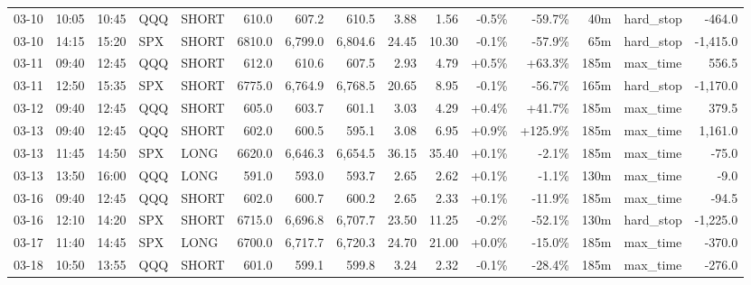 \documentclass[11pt,a4paper,twoside]{article}
\begin{document}
\begin{landscape}
\begin{center}
\begin{longtable}{>{\color{txtmain}}l l l l l r r r r r r r r >{\color{txtmain}}l r}
03-10 & 10:05 & 10:45 & QQQ & SHORT & 610.0 & 607.2 & 610.5 & 3.88 & 1.56 & \textcolor{lossred}{-0.5\%} & \textcolor{lossred}{-59.7\%} & 40m & hard\_stop & \textcolor{lossred}{-464.0} \\
03-10 & 14:15 & 15:20 & SPX & SHORT & 6810.0 & 6,799.0 & 6,804.6 & 24.45 & 10.30 & \textcolor{lossred}{-0.1\%} & \textcolor{lossred}{-57.9\%} & 65m & hard\_stop & \textcolor{lossred}{-1,415.0} \\
03-11 & 09:40 & 12:45 & QQQ & SHORT & 612.0 & 610.6 & 607.5 & 2.93 & 4.79 & \textcolor{wingreen}{+0.5\%} & \textcolor{wingreen}{+63.3\%} & 185m & max\_time & \textcolor{wingreen}{556.5} \\
03-11 & 12:50 & 15:35 & SPX & SHORT & 6775.0 & 6,764.9 & 6,768.5 & 20.65 & 8.95 & \textcolor{lossred}{-0.1\%} & \textcolor{lossred}{-56.7\%} & 165m & hard\_stop & \textcolor{lossred}{-1,170.0} \\
03-12 & 09:40 & 12:45 & QQQ & SHORT & 605.0 & 603.7 & 601.1 & 3.03 & 4.29 & \textcolor{wingreen}{+0.4\%} & \textcolor{wingreen}{+41.7\%} & 185m & max\_time & \textcolor{wingreen}{379.5} \\
03-13 & 09:40 & 12:45 & QQQ & SHORT & 602.0 & 600.5 & 595.1 & 3.08 & 6.95 & \textcolor{wingreen}{+0.9\%} & \textcolor{wingreen}{+125.9\%} & 185m & max\_time & \textcolor{wingreen}{1,161.0} \\
03-13 & 11:45 & 14:50 & SPX & LONG & 6620.0 & 6,646.3 & 6,654.5 & 36.15 & 35.40 & \textcolor{wingreen}{+0.1\%} & \textcolor{lossred}{-2.1\%} & 185m & max\_time & \textcolor{lossred}{-75.0} \\
03-13 & 13:50 & 16:00 & QQQ & LONG & 591.0 & 593.0 & 593.7 & 2.65 & 2.62 & \textcolor{wingreen}{+0.1\%} & \textcolor{lossred}{-1.1\%} & 130m & max\_time & \textcolor{lossred}{-9.0} \\
03-16 & 09:40 & 12:45 & QQQ & SHORT & 602.0 & 600.7 & 600.2 & 2.65 & 2.33 & \textcolor{wingreen}{+0.1\%} & \textcolor{lossred}{-11.9\%} & 185m & max\_time & \textcolor{lossred}{-94.5} \\
03-16 & 12:10 & 14:20 & SPX & SHORT & 6715.0 & 6,696.8 & 6,707.7 & 23.50 & 11.25 & \textcolor{lossred}{-0.2\%} & \textcolor{lossred}{-52.1\%} & 130m & hard\_stop & \textcolor{lossred}{-1,225.0} \\
03-17 & 11:40 & 14:45 & SPX & LONG & 6700.0 & 6,717.7 & 6,720.3 & 24.70 & 21.00 & \textcolor{wingreen}{+0.0\%} & \textcolor{lossred}{-15.0\%} & 185m & max\_time & \textcolor{lossred}{-370.0} \\
03-18 & 10:50 & 13:55 & QQQ & SHORT & 601.0 & 599.1 & 599.8 & 3.24 & 2.32 & \textcolor{lossred}{-0.1\%} & \textcolor{lossred}{-28.4\%} & 185m & max\_time & \textcolor{lossred}{-276.0} \\

\end{longtable}
\end{center}
\end{landscape}
\end{document}
